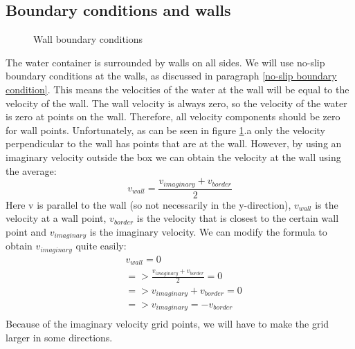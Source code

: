 \documentclass{article}
\begin{document}
\subsection{Boundary conditions and walls} \label{Boundary conditions and walls}
\begin{figure}[ht]
\centering
{}

\caption{Wall boundary conditions} \label{wall boundary conditions}
\end{figure}

The water container is surrounded by walls on all sides.  We will use no-slip boundary conditions at the walls, as discussed in paragraph \ref{no-slip boundary condition}\cite{MAC}. This means the velocities of the water at the wall will be equal to the velocity of the wall. The wall velocity is always zero, so the velocity of the water is zero at points on the wall. Therefore, all velocity components should be zero for wall points\cite{MAC}. Unfortunately, as can be seen in figure \ref{wall boundary conditions}.a only the velocity perpendicular to the wall has points that are at the wall. However, by using an imaginary velocity outside the box we can obtain the velocity at the wall using the average\cite{MAC}:
\[v_{wall}=\frac{v_{imaginary}+v_{border}}{2}\]
Here v is parallel to the wall (so not necessarily in the y-direction), \(v_{wall}\) is the velocity at a wall point, \(v_{border}\) is the velocity that is closest to the certain wall point and \(v_{imaginary}\) is the imaginary velocity. We can modify the formula to obtain \(v_{imaginary}\) quite easily:
\[\begin{split}
&v_{wall}=0\\
&=>\frac{v_{imaginary}+v_{border}}{2}=0\\
&=>v_{imaginary}+v_{border}=0\\
&=>v_{imaginary}=-v_{border}\\
\end{split}\]
Because of the imaginary velocity grid points, we will have to make the grid larger in some directions.\\ \\
\end{document}
